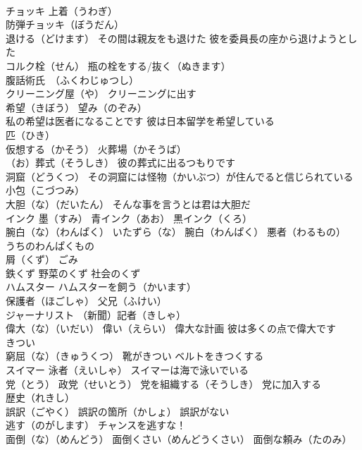 \documentclass[8pt]{extreport}
\begin{document}
\begin{CJK}{UTF8}{min}
\\	チョッキ 上着（うわぎ）
\\	防弾チョッキ（ぼうだん）
\\	退ける（どけます） その間は親友をも退けた 彼を委員長の座から退けようとした
\\	コルク栓（せん） 瓶の栓をする/抜く（ぬきます）
\\	腹話術氏　（ふくわじゅつし）
\\	クリーニング屋（や） クリーニングに出す
\\	希望（きぼう） 望み（のぞみ）
\\	私の希望は医者になることです 彼は日本留学を希望している
\\	匹（ひき）
\\	仮想する（かそう） 火葬場（かそうば）
\\	（お）葬式（そうしき） 彼の葬式に出るつもりです
\\	洞窟（どうくつ） その洞窟には怪物（かいぶつ）が住んでると信じられている
\\	小包（こづつみ）
\\	大胆（な）（だいたん） そんな事を言うとは君は大胆だ
\\	インク 墨（すみ） 青インク（あお） 黒インク（くろ）
\\	腕白（な）（わんぱく） いたずら（な） 腕白（わんぱく） 悪者（わるもの） 
\\	うちのわんぱくもの
\\	屑（くず） ごみ 
\\	鉄くず 野菜のくず 社会のくず
\\	ハムスター ハムスターを飼う（かいます）
\\	保護者（ほごしゃ） 父兄（ふけい）
\\	ジャーナリスト （新聞）記者（きしゃ）
\\	偉大（な）（いだい） 偉い（えらい） 偉大な計画 彼は多くの点で偉大です
\\	きつい 
\\	窮屈（な）（きゅうくつ） 靴がきつい ベルトをきつくする
\\	スイマー 泳者（えいしゃ） スイマーは海で泳いでいる
\\	党（とう） 政党（せいとう） 党を組織する（そうしき） 党に加入する
\\	歴史（れきし）
\\	誤訳（ごやく） 誤訳の箇所（かしょ） 誤訳がない
\\	逃す（のがします） チャンスを逃すな！
\\	面倒（な）（めんどう） 面倒くさい（めんどうくさい） 面倒な頼み（たのみ）

\end{CJK}
\end{document}
